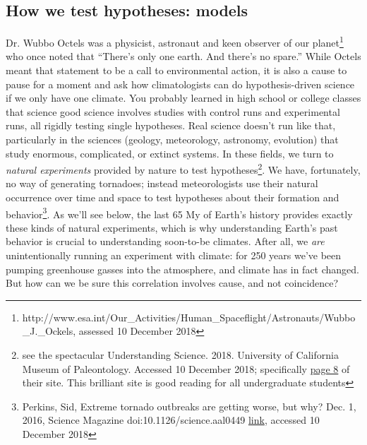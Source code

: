 \documentclass[amstex,12pt]{book}
\begin{document}
\subsection{How we test hypotheses: models}
Dr. Wubbo Octels was a physicist, astronaut and keen observer of our planet\footnote{http://www.esa.int/Our\_Activities/Human\_Spaceflight/Astronauts/Wubbo\_J.\_Ockels, assessed 10 December 2018} who once noted that ``There's only one earth. And there's no spare.'' While Octels meant that statement to be a call to environmental action, it is also a cause to pause for a moment and ask how climatologists can do hypothesis-driven science if we only have one climate. You probably learned in high school or college classes that science good science involves studies with control runs and experimental runs, all rigidly testing single hypotheses. Real science doesn't run like that, particularly in the sciences (geology, meteorology, astronomy, evolution) that study enormous, complicated, or extinct systems. In these fields, we turn to \emph{natural experiments} provided by nature to test hypotheses\footnote{see the spectacular Understanding Science. 2018. University of California Museum of Paleontology. Accessed 10 December 2018; specifically \href{https://undsci.berkeley.edu/article/0_0_0/howscienceworks_08}{page 8} of their site. This brilliant site is good reading for all undergraduate students}. We have, fortunately, no way of generating tornadoes; instead meteorologists use their natural occurrence over time and space to test hypotheses about their formation and behavior\footnote{Perkins, Sid, Extreme tornado outbreaks are getting worse, but why? Dec. 1, 2016, Science Magazine doi:10.1126/science.aal0449 \href{https://www.sciencemag.org/news/2016/12/extreme-tornado-outbreaks-are-getting-worse-why}{link}, accessed 10 December 2018}. As we'll see below, the last 65 My of Earth's history provides exactly these kinds of natural experiments, which is why understanding Earth's past behavior is crucial to understanding soon-to-be climates. After all, we \emph{are} unintentionally running an experiment with climate: for 250 years we've been pumping greenhouse gasses into the atmosphere, and climate has in fact changed. But how can we be sure this correlation involves cause, and not coincidence?\\
\end{document}
